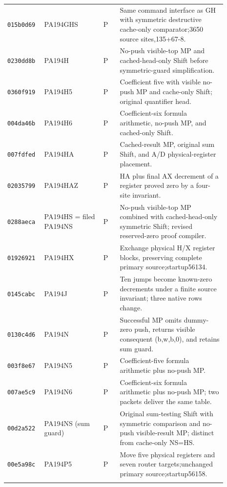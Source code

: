 \begin{longtable}{p{0.12\linewidth}p{0.25\linewidth}p{0.07\linewidth}p{0.45\linewidth}}
\texttt{015b0d69} & PA194GHS & P & Same command interface as GH with symmetric destructive cache-only comparator;3650 source sites,135+67-8. \\ \addlinespace[2pt]
\texttt{0230dd8b} & PA194H & P & No-push visible-top MP and cached-head-only Shift before symmetric-guard simplification. \\ \addlinespace[2pt]
\texttt{0360f919} & PA194H5 & P & Coefficient five with visible no-push MP and cache-only Shift; original quantifier head. \\ \addlinespace[2pt]
\texttt{004da46b} & PA194H6 & P & Coefficient-six formula arithmetic, no-push MP, and cached-only Shift. \\ \addlinespace[2pt]
\texttt{007fdfed} & PA194HA & P & Cached-result MP, original sum Shift, and A/D physical-register placement. \\ \addlinespace[2pt]
\texttt{02035799} & PA194HAZ & P & HA plus final AX decrement of a register proved zero by a four-site invariant. \\ \addlinespace[2pt]
\texttt{0288aeca} & PA194HS = filed PA194NS & P & No-push visible-top MP combined with cached-head-only symmetric Shift; revised reserved-zero proof compiler. \\ \addlinespace[2pt]
\texttt{01926921} & PA194HX & P & Exchange physical H/X register blocks, preserving complete primary source;startup56134. \\ \addlinespace[2pt]
\texttt{0145cabc} & PA194J & P & Ten jumps become known-zero decrements under a finite source invariant; three native rows change. \\ \addlinespace[2pt]
\texttt{0130c4d6} & PA194N & P & Successful MP omits dummy-zero push, returns visible consequent (b,w,b,0), and retains sum guard. \\ \addlinespace[2pt]
\texttt{003f8e67} & PA194N5 & P & Coefficient-five formula arithmetic plus no-push MP. \\ \addlinespace[2pt]
\texttt{007ae5c9} & PA194N6 & P & Coefficient-six formula arithmetic plus no-push MP; two packets deliver the same table. \\ \addlinespace[2pt]
\texttt{00d2a522} & PA194NS (sum guard) & P & Original sum-testing Shift with symmetric comparison and no-push visible-result MP; distinct from cache-only NS=HS. \\ \addlinespace[2pt]
\texttt{00e5a98c} & PA194P5 & P & Move five physical registers and seven router targets;unchanged primary source;startup56158. \\ \addlinespace[2pt]

\end{longtable}
